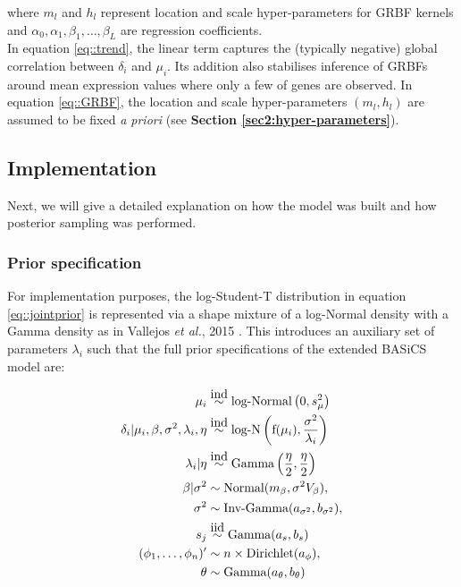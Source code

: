 where $m_l$ and $h_l$ represent location and scale hyper-parameters for GRBF kernels and $\alpha_0, \alpha_1, \beta_1, \ldots, \beta_L$ are regression coefficients. \\

In equation \eqref{eq::trend}, the linear term captures the (typically negative) global correlation between $\delta_i$ and $\mu_i$. 
Its addition also stabilises inference of GRBFs around mean expression values where only a few of genes are observed. 
In equation \eqref{eq::GRBF}, the location and scale hyper-parameters $(m_l, h_l)$ are assumed to be fixed \emph{a priori} (see \textbf{Section \ref{sec2:hyper-parameters}}). 

\newpage

\subsection{Implementation}

Next, we will give a detailed explanation on how the model was built and how posterior sampling was performed.  

\subsubsection{Prior specification}

For implementation purposes, the log-Student-T distribution in equation \eqref{eq::jointprior} is represented via a shape mixture of a log-Normal density with a Gamma density as in Vallejos \emph{et al.}, 2015 \cite{Vallejos2015}. 
This introduces an auxiliary set of parameters $\lambda_i$ such that the full prior specifications of the extended BASiCS model are:

\begin{align*}
\mu_i &\stackrel{\mbox{ind}}{\sim} \mbox{log-Normal}\left(0, s^2_{\mu}\right) \\
\delta_i| \mu_i,\beta,\sigma^2, \lambda_i, \eta &\stackrel{\mbox{ind}}{\sim} \text{log-N}\left( \text{f}(\mu_i),\frac{\sigma^2}{\lambda_i} \right)\\
\lambda_i|\eta &\stackrel{\mbox{ind}}{\sim} \text{Gamma}\left(\frac{\eta}{2},\frac{\eta}{2}\right)\\
\beta|\sigma^2 & \sim \textnormal{Normal}(m_\beta,\sigma^2V_\beta),\\
\sigma^2 & \sim  \textnormal{Inv-Gamma}(a_{\sigma^2},b_{\sigma^2}),\\
s_j & \stackrel{\mbox{iid}}{\sim}  \textnormal{Gamma}(a_s,b_s) \\
(\phi_1, \ldots, \phi_n)' & \sim  n \times \textnormal{Dirichlet}(a_\phi),\\
\theta & \sim  \textnormal{Gamma}(a_\theta,b_\theta)
\end{align*}

